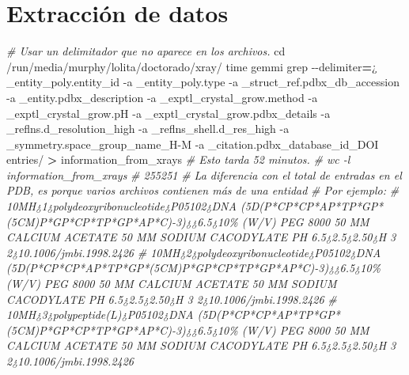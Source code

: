 \documentclass[
]{book}
\newenvironment{Shaded}{\begin{snugshade}}{\end{snugshade}}
\newcommand{\AttributeTok}[1]{\textcolor[rgb]{0.77,0.63,0.00}{#1}}
\newcommand{\BuiltInTok}[1]{#1}
\newcommand{\CommentTok}[1]{\textcolor[rgb]{0.56,0.35,0.01}{\textit{#1}}}
\newcommand{\NormalTok}[1]{#1}
\newcommand{\OperatorTok}[1]{\textcolor[rgb]{0.81,0.36,0.00}{\textbf{#1}}}
\newcommand{\StringTok}[1]{\textcolor[rgb]{0.31,0.60,0.02}{#1}}
\theoremstyle{definition}
\theoremstyle{definition}
\theoremstyle{definition}
\theoremstyle{definition}
\theoremstyle{remark}
\begin{document}
\hypertarget{extracciuxf3n-de-datos-1}{%
\section{Extracción de datos}\label{extracciuxf3n-de-datos-1}}

\begin{Shaded}
\begin{Highlighting}[]
\CommentTok{\# Usar un delimitador que no aparece en los archivos.}
\BuiltInTok{cd}\NormalTok{ /run/media/murphy/lolita/doctorado/xray/}
\BuiltInTok{time}\NormalTok{ gemmi grep }\AttributeTok{{-}{-}delimiter}\OperatorTok{=}\StringTok{\textquotesingle{}¿\textquotesingle{}}\NormalTok{ \_entity\_poly.entity\_id }\AttributeTok{{-}a}\NormalTok{ \_entity\_poly.type }\AttributeTok{{-}a}\NormalTok{ \_struct\_ref.pdbx\_db\_accession }\AttributeTok{{-}a}\NormalTok{ \_entity.pdbx\_description }\AttributeTok{{-}a}\NormalTok{ \_exptl\_crystal\_grow.method }\AttributeTok{{-}a}\NormalTok{ \_exptl\_crystal\_grow.pH }\AttributeTok{{-}a}\NormalTok{ \_exptl\_crystal\_grow.pdbx\_details }\AttributeTok{{-}a}\NormalTok{ \_reflns.d\_resolution\_high }\AttributeTok{{-}a}\NormalTok{ \_reflns\_shell.d\_res\_high }\AttributeTok{{-}a}\NormalTok{ \_symmetry.space\_group\_name\_H{-}M }\AttributeTok{{-}a}\NormalTok{ \_citation.pdbx\_database\_id\_DOI entries/ }\OperatorTok{\textgreater{}}\NormalTok{ information\_from\_xrays}
\CommentTok{\# Esto tarda 52 minutos.}
\CommentTok{\# wc {-}l information\_from\_xrays}
\CommentTok{\# 255251}
\CommentTok{\# La diferencia con el total de entradas en el PDB, es porque varios archivos contienen más de una entidad }
\CommentTok{\# Por ejemplo:}
\CommentTok{\# 10MH¿1¿polydeoxyribonucleotide¿P05102¿DNA (5\textquotesingle{}{-}D(P*CP*CP*AP*TP*GP*(5CM)P*GP*CP*TP*GP*AP*C){-}3\textquotesingle{})¿¿6.5¿10\% (W/V) PEG 8000 50 MM CALCIUM ACETATE 50 MM SODIUM CACODYLATE PH 6.5¿2.5¿2.50¿H 3 2¿10.1006/jmbi.1998.2426}
\CommentTok{\# 10MH¿2¿polydeoxyribonucleotide¿P05102¿DNA (5\textquotesingle{}{-}D(P*CP*CP*AP*TP*GP*(5CM)P*GP*CP*TP*GP*AP*C){-}3\textquotesingle{})¿¿6.5¿10\% (W/V) PEG 8000 50 MM CALCIUM ACETATE 50 MM SODIUM CACODYLATE PH 6.5¿2.5¿2.50¿H 3 2¿10.1006/jmbi.1998.2426}
\CommentTok{\# 10MH¿3¿polypeptide(L)¿P05102¿DNA (5\textquotesingle{}{-}D(P*CP*CP*AP*TP*GP*(5CM)P*GP*CP*TP*GP*AP*C){-}3\textquotesingle{})¿¿6.5¿10\% (W/V) PEG 8000 50 MM CALCIUM ACETATE 50 MM SODIUM CACODYLATE PH 6.5¿2.5¿2.50¿H 3 2¿10.1006/jmbi.1998.2426}
\end{Highlighting}
\end{Shaded}
\end{document}
